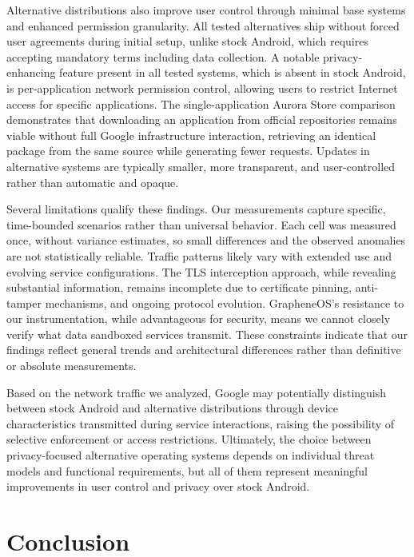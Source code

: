 \documentclass[runningheads]{llncs}
\begin{document}
Alternative distributions also improve user control through minimal base systems and enhanced permission granularity. All tested alternatives ship without forced user agreements during initial setup, unlike stock Android, which requires accepting mandatory terms including data collection. A notable privacy-enhancing feature present in all tested systems, which is absent in stock Android, is per-application network permission control, allowing users to restrict Internet access for specific applications. The single-application Aurora Store comparison demonstrates that downloading an application from official repositories remains viable without full Google infrastructure interaction, retrieving an identical package from the same source while generating fewer requests. Updates in alternative systems are typically smaller, more transparent, and user-controlled rather than automatic and opaque.

Several limitations qualify these findings. Our measurements capture specific, time-bounded scenarios rather than universal behavior. Each cell was measured once, without variance estimates, so small differences and the observed anomalies are not statistically reliable. Traffic patterns likely vary with extended use and evolving service configurations. The TLS interception approach, while revealing substantial information, remains incomplete due to certificate pinning, anti-tamper mechanisms, and ongoing protocol evolution. GrapheneOS's resistance to our instrumentation, while advantageous for security, means we cannot closely verify what data sandboxed services transmit. These constraints indicate that our findings reflect general trends and architectural differences rather than definitive or absolute measurements.

Based on the network traffic we analyzed, Google may potentially distinguish between stock Android and alternative distributions through device characteristics transmitted during service interactions, raising the possibility of selective enforcement or access restrictions. Ultimately, the choice between privacy-focused alternative operating systems depends on individual threat models and functional requirements, but all of them represent meaningful improvements in user control and privacy over stock Android.

\section{Conclusion}
\end{document}
